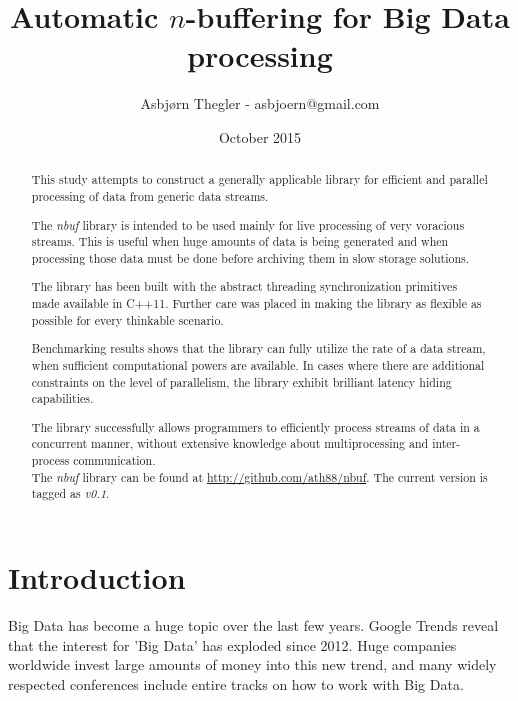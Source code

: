 \documentclass[a4paper]{article}
\title{Automatic $n$-buffering for Big Data processing}
\author{Asbj\o rn Thegler - asbjoern@gmail.com}
\date{October 2015}
\newcommand{\nbuf}{\textit{nbuf} }
\begin{document}
\maketitle

\sloppy

\begin{abstract}
\begin{doublespace}
This study attempts to construct a generally applicable library for efficient and parallel processing of data from generic data streams.

The \nbuf library is intended to be used mainly for live processing of very voracious streams. This is useful when huge amounts of data is being generated and when processing those data must be done before archiving them in slow storage solutions.

The library has been built with the abstract threading synchronization primitives made available in C++11. Further care was placed in making the library as flexible as possible for every thinkable scenario.

Benchmarking results shows that the library can fully utilize the rate of a data stream, when sufficient computational powers are available. In cases where there are additional constraints on the level of parallelism, the library exhibit brilliant latency hiding capabilities.

The library successfully allows programmers to efficiently process streams of data in a concurrent manner, without extensive knowledge about multiprocessing and inter-process communication.\\

The \nbuf library can be found at \url{http://github.com/ath88/nbuf}. The current version is tagged as \textit{v0.1}.

\end{doublespace}
\end{abstract}

\newpage
\tableofcontents

\newpage
{}
\section{Introduction}
Big Data has become a huge topic over the last few years. Google Trends reveal that the interest for 'Big Data' has exploded since 2012. Huge companies worldwide invest large amounts of money into this new trend\cite{bigdatainvest}, and many widely respected conferences include entire tracks on how to work with Big Data.\\
\end{document}
